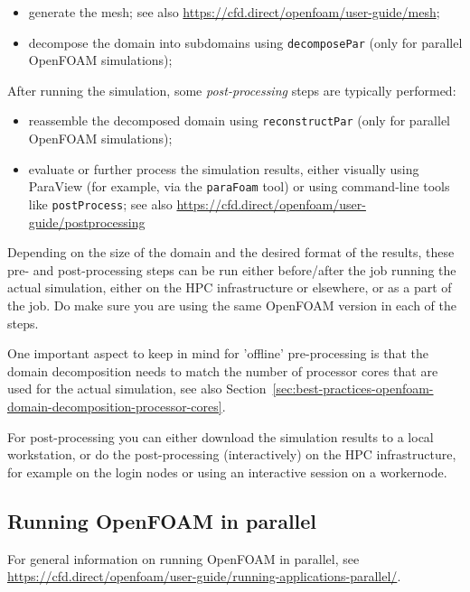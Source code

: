 \begin{itemize}
\item generate the mesh; see also {\small\url{https://cfd.direct/openfoam/user-guide/mesh}};
\item decompose the domain into subdomains using {\small\texttt{decomposePar}} (only for parallel OpenFOAM simulations);
\end{itemize}

After running the simulation, some \textit{post-processing} steps are typically performed:

\begin{itemize}
\item reassemble the decomposed domain using {\small\texttt{reconstructPar}} (only for parallel OpenFOAM simulations);
\item evaluate or further process the simulation results, either visually using ParaView
      (for example, via the {\small\texttt{paraFoam}} tool) or using command-line tools like {\small\texttt{postProcess}};
      see also {\small\url{https://cfd.direct/openfoam/user-guide/postprocessing}}

\end{itemize}

Depending on the size of the domain and the desired format of the results, these pre- and post-processing
steps can be run either before/after the job running the actual simulation, either on the HPC infrastructure
or elsewhere, or as a part of the job. Do make sure you are using the same OpenFOAM version in each of the steps.

One important aspect to keep in mind for 'offline' pre-processing is that the domain decomposition needs to match
the number of processor cores that are used for the actual simulation,
see also Section~\ref{sec:best-practices-openfoam-domain-decomposition-processor-cores}.

For post-processing you can either download the simulation results to a local workstation,
or do the post-processing (interactively) on the HPC infrastructure, for example on the login nodes
or using an interactive session on a workernode.


\subsection{Running OpenFOAM in parallel}

For general information on running OpenFOAM in parallel,
see {\small\url{https://cfd.direct/openfoam/user-guide/running-applications-parallel/}}.

